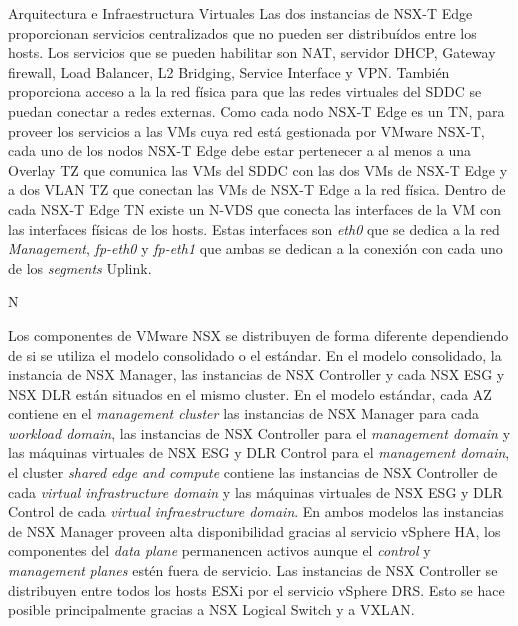 \begin{subsection}{Arquitectura e Infraestructura Virtuales\cite{CFVirtInfraes}}
Las dos instancias de NSX-T Edge proporcionan servicios centralizados que no pueden ser distribuídos entre los hosts. Los servicios que se pueden habilitar son NAT, servidor DHCP, Gateway firewall, Load Balancer, L2 Bridging, Service Interface y VPN. También proporciona acceso a la la red física para que las redes virtuales del SDDC se puedan conectar a redes externas. Como cada nodo NSX-T Edge es un TN, para proveer los servicios a las VMs cuya red está gestionada por VMware NSX-T, cada uno de los nodos NSX-T Edge debe estar pertenecer a al menos a una Overlay TZ que comunica las VMs del SDDC con las dos VMs de NSX-T Edge y a dos VLAN TZ que conectan las VMs de NSX-T Edge a la red física. 
Dentro de cada NSX-T Edge TN existe un N-VDS que conecta las interfaces de la VM con las interfaces físicas de los hosts. Estas interfaces son \textit{eth0} que se dedica a la red \textit{Management}, \textit{fp-eth0} y \textit{fp-eth1} que ambas se dedican a la conexión con cada uno de los \textit{segments} Uplink. 





N

Los componentes de VMware NSX se distribuyen de forma diferente dependiendo de si se utiliza el modelo consolidado o el estándar. En el modelo consolidado, la instancia de NSX Manager, las instancias de NSX Controller y cada NSX ESG y NSX DLR están situados en el mismo cluster. En el modelo estándar, cada AZ contiene en el \textit{management cluster} las instancias de NSX Manager para cada \textit{workload domain}, las instancias de NSX Controller para el \textit{management domain} y las máquinas virtuales de NSX ESG y DLR Control para el \textit{management domain}, el cluster \textit{shared edge and compute} contiene las instancias de NSX Controller de cada \textit{virtual infrastructure domain} y las máquinas virtuales de NSX ESG y DLR Control de cada \textit{virtual infraestructure domain}. En ambos modelos las instancias de NSX Manager proveen alta disponibilidad gracias al servicio vSphere HA, los componentes del \textit{data plane} permanencen activos aunque el \textit{control} y \textit{management} \textit{planes} estén fuera de servicio. Las instancias de NSX Controller se distribuyen entre todos los hosts ESXi por el servicio vSphere DRS.
 Esto se hace posible principalmente gracias a NSX Logical Switch y a VXLAN.\\





\end{subsection}
